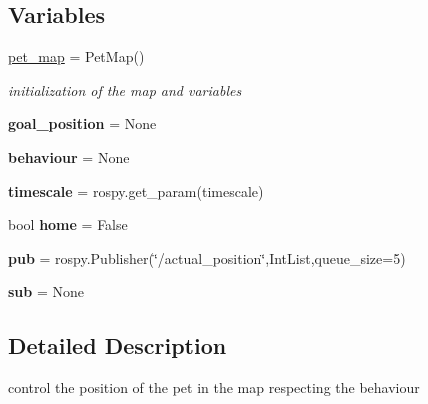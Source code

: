 \subsection*{Variables}
\begin{DoxyCompactItemize}
\item 
\mbox{\label{namespacemotion__controller_a8ac02bda1a8eb65904002041626fc5c4}} 
\hyperlink{namespacemotion__controller_a8ac02bda1a8eb65904002041626fc5c4}{pet\+\_\+map} = Pet\+Map()
\begin{DoxyCompactList}\small\item\em initialization of the map and variables \end{DoxyCompactList}\item 
\mbox{\label{namespacemotion__controller_ad0c236105be213f01f26f9b82746bad3}} 
{\bfseries goal\+\_\+position} = None
\item 
\mbox{\label{namespacemotion__controller_a59855c6c759e43e15becff8da2993298}} 
{\bfseries behaviour} = None
\item 
\mbox{\label{namespacemotion__controller_ac7a2319b315fc7099ca438419541baff}} 
{\bfseries timescale} = rospy.\+get\+\_\+param(\textquotesingle{}timescale\textquotesingle{})
\item 
\mbox{\label{namespacemotion__controller_a88e04e4993ea68310131342873cd53a7}} 
bool {\bfseries home} = False
\item 
\mbox{\label{namespacemotion__controller_adc4eb7fa2ec8ead019615208248fe2f3}} 
{\bfseries pub} = rospy.\+Publisher(\char`\"{}/actual\+\_\+position\char`\"{},Int\+List,queue\+\_\+size=5)
\item 
\mbox{\label{namespacemotion__controller_a3bc548adde90d1979cbb1c2823d411dd}} 
{\bfseries sub} = None
\end{DoxyCompactItemize}


\subsection{Detailed Description}
control the position of the pet in the map respecting the behaviour 


